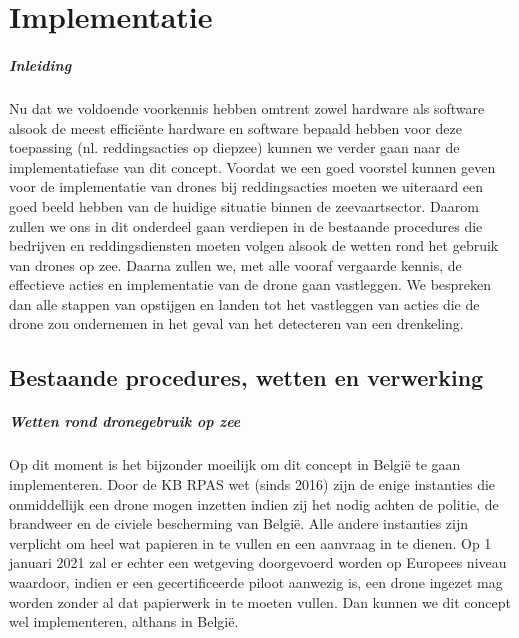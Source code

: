 \chapter{Implementatie}
\label{ch:implementatie}

\paragraph{Inleiding}

Nu dat we voldoende voorkennis hebben omtrent zowel hardware als software alsook de meest efficiënte hardware en software bepaald hebben voor deze toepassing (nl. reddingsacties op diepzee) kunnen we verder gaan naar de implementatiefase van dit concept. Voordat we een goed voorstel kunnen geven voor de implementatie van drones bij reddingsacties moeten we uiteraard een goed beeld hebben van de huidige situatie binnen de zeevaartsector. Daarom zullen we ons in dit onderdeel gaan verdiepen in de bestaande procedures die bedrijven en reddingsdiensten moeten volgen alsook de wetten rond het gebruik van drones op zee. Daarna zullen we, met alle vooraf vergaarde kennis, de effectieve acties en implementatie van de drone gaan vastleggen. We bespreken dan alle stappen van opstijgen en landen tot het vastleggen van acties die de drone zou ondernemen in het geval van het detecteren van een drenkeling. 

\section{Bestaande procedures, wetten en verwerking}

\paragraph{Wetten rond dronegebruik op zee}

Op dit moment is het bijzonder moeilijk om dit concept in België te gaan implementeren. Door de KB RPAS wet (sinds 2016) zijn de enige instanties die onmiddellijk een drone mogen inzetten indien zij het nodig achten de politie, de brandweer en de civiele bescherming van België. Alle andere instanties zijn verplicht om heel wat papieren in te vullen en een aanvraag in te dienen. Op 1 januari 2021 zal er echter een wetgeving doorgevoerd worden op Europees niveau waardoor, indien er een gecertificeerde piloot aanwezig is, een drone ingezet mag worden zonder al dat papierwerk in te moeten vullen. Dan kunnen we dit concept wel implementeren, althans in België. 

